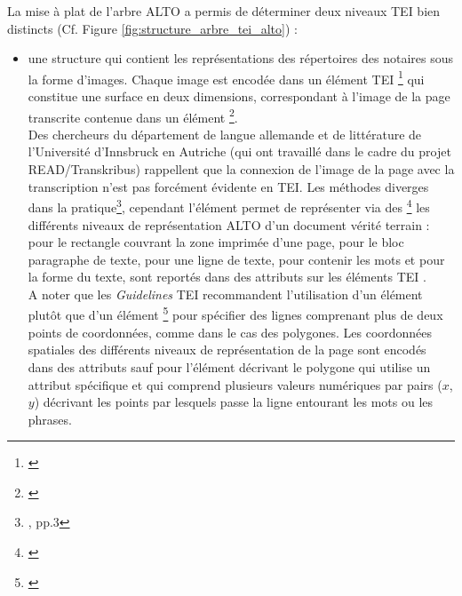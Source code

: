 La mise à plat de l'arbre ALTO a permis de déterminer deux niveaux TEI bien distincts (Cf. Figure \ref{fig:structure_arbre_tei_alto}) : 
\begin{itemize}
    \item une structure  qui contient les représentations des répertoires des notaires sous la forme d'images. Chaque image est encodée dans un élément TEI \footnote{\cite{tei_tei_nodate-15}} qui constitue une surface en deux dimensions, correspondant à l'image de la page transcrite contenue dans un élément \footnote{\cite{tei_tei_nodate-14}}.\\
    Des chercheurs du département de langue allemande et de littérature de l'Université d'Innsbruck en Autriche (qui ont travaillé dans le cadre du projet READ/Transkribus) rappellent que la connexion de l'image de la page avec la transcription n'est pas forcément évidente en TEI. Les méthodes diverges dans la pratique\footnote{\cite{muhlberger_preprint_2014}, pp.3}, cependant l'élément  permet de représenter via des  \footnote{\cite{tei_tei_nodate-13}} les différents niveaux de représentation ALTO d'un document vérité terrain :  pour le rectangle couvrant la zone imprimée d'une page,  pour le bloc paragraphe de texte,  pour une ligne de texte,  pour contenir les mots et  pour la forme du texte, sont reportés dans des attributs  sur les éléments TEI .\\
    A noter que les \textit{Guidelines} TEI recommandent l'utilisation d'un élément  plutôt que d'un élément \footnote{\cite{tei_tei_nodate-12}} pour spécifier des lignes comprenant plus de deux points de coordonnées, comme dans le cas des polygones. Les coordonnées spatiales des différents niveaux de représentation de la page sont encodés dans des attributs  sauf pour l'élément  décrivant le polygone qui utilise un attribut  spécifique et qui comprend plusieurs valeurs numériques par pairs ($x$,$y$) décrivant les points par lesquels passe la ligne entourant les mots ou les phrases.\\

\end{itemize}
